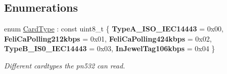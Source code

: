\subsection*{Enumerations}
\begin{DoxyCompactItemize}
\item 
\mbox{\label{namespacenfc_1_1pn532_1_1command_ac328c34e45a34dbcb476249e08402db0}} 
enum \hyperlink{namespacenfc_1_1pn532_1_1command_ac328c34e45a34dbcb476249e08402db0}{Card\+Type} \+: const uint8\+\_\+t \{ \newline
{\bfseries Type\+A\+\_\+\+I\+S\+O\+\_\+\+I\+E\+C14443} = 0x00, 
{\bfseries Feli\+Ca\+Polling212kbps} = 0x01, 
{\bfseries Feli\+Ca\+Polling424kbps} = 0x02, 
{\bfseries Type\+B\+\_\+\+I\+S0\+\_\+\+I\+E\+C14443} = 0x03, 
\newline
{\bfseries In\+Jewel\+Tag106kbps} = 0x04
 \}\begin{DoxyCompactList}\small\item\em Different cardtypes the pn532 can read. \end{DoxyCompactList}
\end{DoxyCompactItemize}
